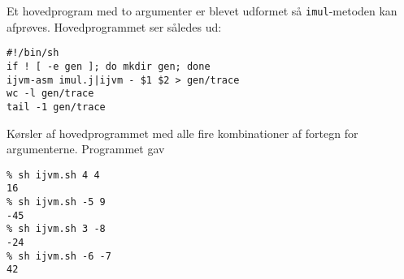 \documentclass[12pt,a4paper]{article}
\begin{document}
Et hovedprogram med to argumenter er blevet udformet så \texttt{imul}-metoden
kan afprøves. Hovedprogrammet ser således ud:

\begin{lstlisting}
#!/bin/sh
if ! [ -e gen ]; do mkdir gen; done
ijvm-asm imul.j|ijvm - $1 $2 > gen/trace
wc -l gen/trace
tail -1 gen/trace
\end{lstlisting}

Kørsler af hovedprogrammet med alle fire kombinationer af fortegn for argumenterne. Programmet gav

\begin{lstlisting}
% sh ijvm.sh 4 4
16
% sh ijvm.sh -5 9
-45
% sh ijvm.sh 3 -8
-24
% sh ijvm.sh -6 -7
42
\end{lstlisting}
\end{document}

